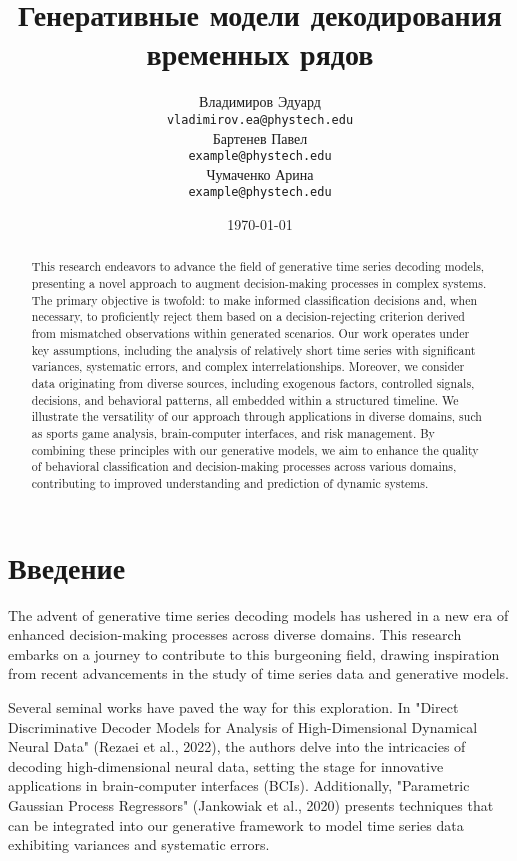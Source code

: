 \documentclass[a4paper, 12pt]{article}
\title{Генеративные модели декодирования временных рядов}
\author{Владимиров Эдуард \\
	\texttt{vladimirov.ea@phystech.edu} \\	
	\And
	Бартенев Павел \\
	\texttt{example@phystech.edu} \\
	\And
	Чумаченко Арина \\
	\texttt{example@phystech.edu}
}
\date{\today}
\begin{document}
\maketitle

\begin{abstract}
	This research endeavors to advance the field of generative time series decoding models, presenting a novel approach to augment decision-making processes in complex systems. The primary objective is twofold: to make informed classification decisions and, when necessary, to proficiently reject them based on a decision-rejecting criterion derived from mismatched observations within generated scenarios. Our work operates under key assumptions, including the analysis of relatively short time series with significant variances, systematic errors, and complex interrelationships. Moreover, we consider data originating from diverse sources, including exogenous factors, controlled signals, decisions, and behavioral patterns, all embedded within a structured timeline. We illustrate the versatility of our approach through applications in diverse domains, such as sports game analysis, brain-computer interfaces, and risk management. By combining these principles with our generative models, we aim to enhance the quality of behavioral classification and decision-making processes across various domains, contributing to improved understanding and prediction of dynamic systems.
\end{abstract}



\section{Введение}
	The advent of generative time series decoding models has ushered in a new era of enhanced decision-making processes across diverse domains. This research embarks on a journey to contribute to this burgeoning field, drawing inspiration from recent advancements in the study of time series data and generative models.
	
	Several seminal works have paved the way for this exploration. In "Direct Discriminative Decoder Models for Analysis of High-Dimensional Dynamical Neural Data" (Rezaei et al., 2022), the authors delve into the intricacies of decoding high-dimensional neural data, setting the stage for innovative applications in brain-computer interfaces (BCIs). Additionally, "Parametric Gaussian Process Regressors" (Jankowiak et al., 2020) presents techniques that can be integrated into our generative framework to model time series data exhibiting variances and systematic errors.
	
\end{document}
